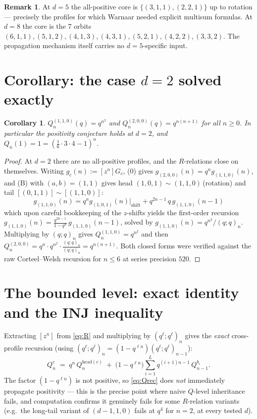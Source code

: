 \documentclass[11pt]{article}
\newtheorem{corollary}[theorem]{Corollary}
\theoremstyle{definition}
\newtheorem{remark}[theorem]{Remark}
\begin{document}
\begin{remark}
At $d=5$ the all-positive core is $\{(3,1,1),(2,2,1)\}$ up to rotation --- precisely
the profiles for which Warnaar needed explicit multisum formulas. At $d=8$ the core is
the $7$ orbits $(6,1,1),(5,1,2),(4,1,3),(4,3,1),(5,2,1),(4,2,2),(3,3,2)$. The
propagation mechanism itself carries no $d=5$-specific input.
\end{remark}

\section{Corollary: the case $d=2$ solved exactly}

\begin{corollary}\label{cor:d2}
$Q_n^{(1,1,0)}(q)=q^{n^2}$ and $Q_n^{(2,0,0)}(q)=q^{n(n+1)}$ for all $n\ge 0$. In
particular the positivity conjecture holds at $d=2$, and $Q_n(1)=1=(\tfrac16\cdot3\cdot4-1)^n$.
\end{corollary}

\begin{proof}
At $d=2$ there are no all-positive profiles, and the $R$-relations close on
themselves. Writing $g_c(n):=[z^n]G_c$, (0) gives $g_{(2,0,0)}(n)=q^n g_{(1,1,0)}(n)$,
and (B) with $(a,b)=(1,1)$ gives head $(1,0,1)\sim(1,1,0)$\,(rotation) and tail
$[(0,1,1)]\sim[(1,1,0)]$:
\[
g_{(1,1,0)}(n) = q^{n} g_{(1,0,1)}(n)\big|_{\text{shift}} + q^{2n-1}\,q\,g_{(1,1,0)}(n-1)
\]
which upon careful bookkeeping of the $z$-shifts yields the first-order recursion
$g_{(1,1,0)}(n)=\frac{q^{2n-1}}{1-q^n}\,g_{(1,1,0)}(n-1)$, solved by
$g_{(1,1,0)}(n)=q^{n^2}/(q;q)_n$. Multiplying by $(q;q)_n$ gives
$Q_n^{(1,1,0)}=q^{n^2}$ and then $Q_n^{(2,0,0)}=q^n\cdot q^{n^2}\cdot\frac{(q;q)_n}{(q;q)_n}=q^{n(n+1)}$.
Both closed forms were verified against the raw Corteel--Welsh recursion for
$n\le 6$ at series precision $520$.
\end{proof}

\section{The bounded level: exact identity and the INJ inequality}\label{sec:Q}

Extracting $[z^n]$ from \eqref{eq:R} and multiplying by $(q^\ell;q^\ell)_n$ gives the
\emph{exact} cross-profile recursion (using $(q^\ell;q^\ell)_n=(1-q^{\ell n})(q^\ell;q^\ell)_{n-1}$):
\begin{equation}\label{eq:Qrec}
Q_n^{c} \;=\; q^{n}\, Q_n^{\mathrm{head}(c)}
\;+\; \big(1-q^{\ell n}\big) \sum_{i=1}^{L} q^{(i+1)n-1}\, Q_{n-1}^{b_i}.
\end{equation}
The factor $(1-q^{\ell n})$ is not positive, so \eqref{eq:Qrec} does \emph{not}
immediately propagate positivity --- this is the precise point where naive $Q$-level
inheritance fails, and computation confirms it genuinely fails for some $R$-relation
variants (e.g.\ the long-tail variant of $(d{-}1,1,0)$ fails at $q^4$ for $n=2$, at
every tested $d$).
\end{document}
